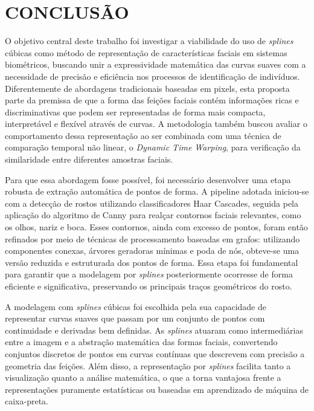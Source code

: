 \chapter{CONCLUSÃO} \label{cha:conclusao}

O objetivo central deste trabalho foi investigar a viabilidade do uso de \textit{splines} cúbicas como método de representação de características faciais em sistemas biométricos, buscando unir a expressividade matemática das curvas suaves com a necessidade de precisão e eficiência nos processos de identificação de indivíduos. Diferentemente de abordagens tradicionais baseadas em pixels, esta proposta parte da premissa de que a forma das feições faciais contém informações ricas e discriminativas que podem ser representadas de forma mais compacta, interpretável e flexível através de curvas. A metodologia também buscou avaliar o comportamento dessa representação ao ser combinada com uma técnica de comparação temporal não linear, o \textit{Dynamic Time Warping}, para verificação da similaridade entre diferentes amostras faciais.

Para que essa abordagem fosse possível, foi necessário desenvolver uma etapa robusta de extração automática de pontos de forma. A pipeline adotada iniciou-se com a detecção de rostos utilizando classificadores Haar Cascades, seguida pela aplicação do algoritmo de Canny para realçar contornos faciais relevantes, como os olhos, nariz e boca. Esses contornos, ainda com excesso de pontos, foram então refinados por meio de técnicas de processamento baseadas em grafos: utilizando componentes conexas, árvores geradoras mínimas e poda de nós, obteve-se uma versão reduzida e estruturada dos pontos de forma. Essa etapa foi fundamental para garantir que a modelagem por \textit{splines} posteriormente ocorresse de forma eficiente e significativa, preservando os principais traços geométricos do rosto.

A modelagem com \textit{splines} cúbicas foi escolhida pela sua capacidade de representar curvas suaves que passam por um conjunto de pontos com continuidade e derivadas bem definidas. As \textit{splines} atuaram como intermediárias entre a imagem e a abstração matemática das formas faciais, convertendo conjuntos discretos de pontos em curvas contínuas que descrevem com precisão a geometria das feições. Além disso, a representação por \textit{splines} facilita tanto a visualização quanto a análise matemática, o que a torna vantajosa frente a representações puramente estatísticas ou baseadas em aprendizado de máquina de caixa-preta.



